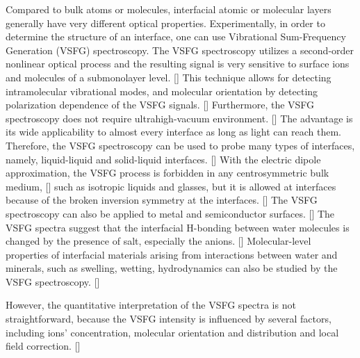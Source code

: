 Compared to bulk atoms or molecules,
interfacial atomic or molecular layers generally have very different optical properties. 
Experimentally, in order to determine the structure of an interface, one can use Vibrational Sum-Frequency Generation (VSFG) spectroscopy.
The VSFG spectroscopy utilizes a second-order nonlinear optical process and the resulting signal is very sensitive to surface ions and 
molecules of a submonolayer level. [\cite{Morita2008,WangHongFei2015,WenYuChieh2016,Ishiyama2017,Penalber-Johnstone2018}] 
This technique allows for detecting intramolecular vibrational modes, and molecular orientation by detecting polarization dependence of the VSFG signals. [\cite{Vidal05}]  
Furthermore, the VSFG spectroscopy does not require ultrahigh-vacuum environment. [\cite{WeiX02}]
The advantage is its wide applicability to almost every interface as long as light can reach them. 
Therefore, the VSFG spectroscopy can be used to probe many types of interfaces, namely, liquid-liquid and 
solid-liquid interfaces. [\cite{Guyot-Sionnest1987,RS91,QD93,QD94,Richmond02,Gopalakrishnan2006,ShenYR2006,Morita2008}]
With the electric dipole approximation, the VSFG process is forbidden in any centrosymmetric bulk medium, [\cite{Che12}] 
such as isotropic liquids and glasses,  but it is allowed at interfaces because of the broken inversion symmetry at the interfaces. [\cite{PF00}]
The VSFG spectroscopy can also be applied to metal and semiconductor surfaces. [\cite{Harris87,Superfine88}]
The VSFG spectra suggest that the interfacial H-bonding between water molecules is changed by the presence of salt, 
especially the anions. [\cite{EAR04}]
Molecular-level properties of interfacial materials arising from interactions between water and minerals, 
such as swelling, wetting, hydrodynamics can also be studied by the VSFG spectroscopy. [\cite{Rotenberg14}]

However, the quantitative interpretation of the VSFG spectra is not straightforward,
because the VSFG intensity is influenced by several factors, including ions' concentration, 
molecular orientation and distribution and local field correction. [\cite{Morita2008}]

